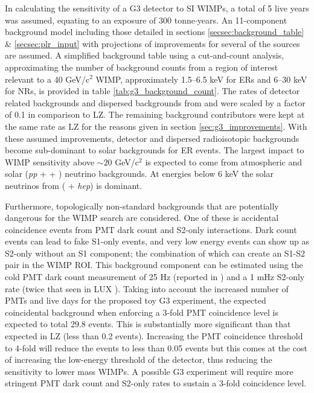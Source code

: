 In calculating the sensitivity of a G3 detector to SI WIMPs, a total of 5 live years was assumed, equating to an exposure of 300 tonne$\cdot$years. An 11-component background model including those detailed in sections \ref{secsec:background_table} \& \ref{secsec:plr_input} with projections of improvements for several of the sources are assumed. A simplified background table using a cut-and-count analysis, approximating the number of background counts from a region of interest relevant to a 40 GeV/c$^{2}$ WIMP, approximately 1.5--6.5 keV for ERs and 6--30 keV for NRs, is provided in table \ref{tab:g3_background_count}. The rates of detector related backgrounds and dispersed backgrounds from \RnTTT{} and \RnTTZ{} were scaled by a factor of 0.1 in comparison to LZ. The remaining background contributors were kept at the same rate as LZ for the reasons given in section \ref{sec:g3_improvements}. With these assumed improvements, detector and dispersed radioisotopic backgrounds become sub-dominant to solar backgrounds for ER events. The largest impact to WIMP sensitivity above $\sim20$ GeV/c$^{2}$ is expected to come from atmospheric and solar (\textit{pp} + \BeS{} + \NOT{}) neutrino backgrounds. At energies below 6 keV the solar neutrinos from (\BE{} $+$ \textit{hep}) is dominant. 

Furthermore, topologically non-standard backgrounds that are potentially dangerous for the WIMP search are considered. One of these is accidental coincidence events from PMT dark count and S2-only interactions. Dark count events can lead to fake S1-only events, and very low energy events can show up as S2-only without an S1 component; the combination of which can create an S1-S2 pair in the WIMP ROI. This background component can be estimated using the cold PMT dark count measurement of 25 Hz (reported in \cite{Aprile_2017}) and a 1 mHz S2-only rate (twice that seen in LUX \cite{Akerib_2016}). Taking into account the increased number of PMTs and live days for the proposed toy G3 experiment, the expected coincidental background when enforcing a 3-fold PMT coincidence level is expected to total 29.8 events. This is substantially more significant than that expected in LZ (less than 0.2 events). Increasing the PMT coincidence threshold to 4-fold will reduce the events to less than 0.05 events but this comes at the cost of increasing the low-energy threshold of the detector, thus reducing the sensitivity to lower mass WIMPs. A possible G3 experiment will require more stringent PMT dark count and S2-only rates to sustain a 3-fold coincidence level. 

